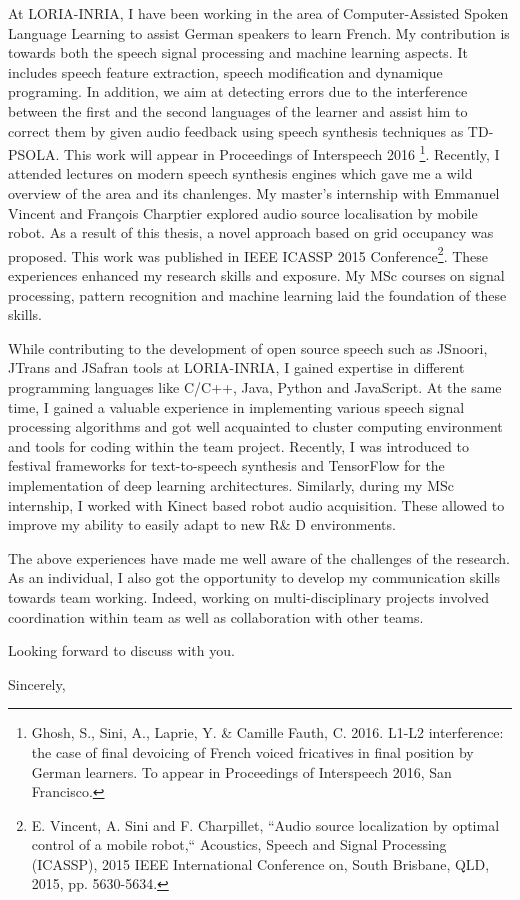 \documentclass[
	pagenumber=false, %
	parskip=half, %
	fromalign=right, %
	foldmarks=false, %
	addrfield=false %
	]{scrlttr2}
\begin{document}
\begin{letter}
At LORIA-INRIA, I have been working in the area of Computer-Assisted Spoken Language Learning to assist German speakers to learn French. My contribution is towards both the speech signal processing and machine learning aspects. It includes speech feature extraction, speech modification and dynamique programing. In addition, we aim at detecting errors due to the interference between the first and the second languages of the learner and assist him to correct them by given audio feedback using speech synthesis techniques as TD\-- PSOLA. This work will appear in Proceedings of Interspeech 2016 \footnote{Ghosh, S., Sini, A., Laprie, Y. \& Camille Fauth, C. 2016. L1-L2 interference: the case of final devoicing of French voiced fricatives in final position by German learners. To appear in Proceedings of Interspeech 2016, San Francisco.}. Recently, I attended lectures on modern speech synthesis engines which gave me a wild overview of the area and its chanlenges. My master's internship with Emmanuel Vincent and François Charptier explored audio source localisation by mobile robot. As a result of this thesis, a novel approach based on grid occupancy was proposed. This work was published in IEEE ICASSP 2015 Conference\footnote{E. Vincent, A. Sini and F. Charpillet, ``Audio source localization by optimal control of a mobile robot,`` Acoustics, Speech and Signal Processing (ICASSP), 2015 IEEE International Conference on, South Brisbane, QLD, 2015, pp. 5630-5634.}. These experiences enhanced my research skills and exposure. My MSc courses on signal processing, pattern recognition and machine learning laid the foundation of these skills.   

		
While contributing to the development of open source speech such as JSnoori, JTrans and JSafran tools at LORIA-INRIA, I gained expertise in different programming languages like C/C++, Java, Python and JavaScript. At the same time, I gained a valuable experience in implementing  various speech signal processing algorithms and got well acquainted 	to cluster computing environment	and tools for coding within the team project. Recently, I was introduced to festival frameworks for text\--to\--speech synthesis and TensorFlow for the implementation of deep learning architectures. Similarly, during my MSc internship, I worked with Kinect based robot audio acquisition. These allowed to improve my ability to easily adapt to new R\& D environments.    

 The above experiences have made me well aware of the challenges of the research. As an individual, I also got the opportunity to develop my communication skills towards team 		
 working. Indeed, working on multi-disciplinary projects involved coordination within  team as well as collaboration with other teams. 
 

 

Looking forward to discuss with you.


\closing{Sincerely,}



\end{letter}
 
\end{document}
